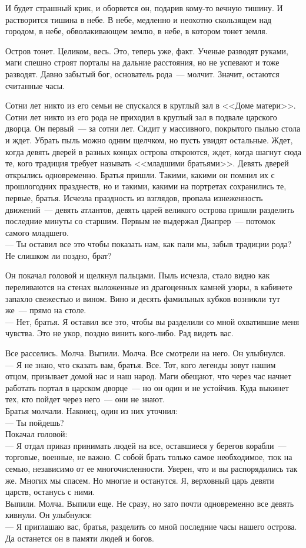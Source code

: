 И будет страшный крик, и оборвется он, подарив кому-то вечную тишину. И 
растворится тишина в небе. В небе, медленно и неохотно скользящем над городом, 
в 
небе, обволакивающем землю, в небе, в котором тонет земля.

Остров тонет. Целиком, весь. Это, теперь уже, факт. Ученые разводят руками, 
маги 
спешно строят порталы на дальние расстояния, но не успевают и тоже разводят. 
Давно забытый бог, основатель рода~--- молчит. Значит, остаются считанные часы.

Сотни лет никто из его семьи не спускался в круглый зал в <<Доме матери>>. 
Сотни 
лет никто из его рода не приходил в круглый зал в подвале царского дворца. Он 
первый~--- за сотни лет. Сидит у массивного, покрытого пылью стола и ждет. 
Убрать 
пыль можно одним щелчком, но пусть увидят остальные. Ждет, когда девять дверей 
в 
разных концах острова откроются, ждет, когда шагнут сюда те, кого традиция 
требует называть <<младшими братьями>>. Девять дверей открылись одновременно. 
Братья пришли. Такими, какими он помнил их с прошлогодних празднеств, но и 
такими, какими на портретах сохранились те, первые, братья. Исчезла праздность 
из взглядов, пропала изнеженность движений~--- девять атлантов, девять царей 
великого острова пришли разделить последние минуты со старшим. Первым не 
выдержал Диапрер~--- потомок самого младшего.\\
--- Ты оставил все это чтобы показать нам, как пали мы, забыв традиции рода? 
Не слишком ли поздно, брат?

Он покачал головой и щелкнул пальцами. Пыль исчезла, стало видно как 
переливаются на стенах выложенные из драгоценных камней узоры, в кабинете 
запахло свежестью и вином. Вино и десять фамильных кубков возникли тут же~--- 
прямо на столе.\\
--- Нет, братья. Я оставил все это, чтобы вы разделили со мной охватившие меня 
чувства. Это не укор, поздно винить кого-либо. Рад видеть вас.

Все расселись. Молча. Выпили. Молча. Все смотрели на него. Он улыбнулся.\\
--- Я не знаю, что сказать вам, братья. Все. Тот, кого легенды зовут нашим 
отцом, призывает домой нас и наш народ. Маги обещают, что через час начнет 
работать портал в царском дворце~--- но он один и не устойчив. Куда выкинет 
тех, кто пойдет через него~--- они не знают.\\
Братья молчали. Наконец, один из них уточнил:\\
--- Ты пойдешь?\\
Покачал головой:\\
--- Я отдал приказ принимать людей на все, оставшиеся у берегов корабли~--- 
торговые, военные, не важно. С собой брать только самое необходимое, тюк на 
семью, независимо от ее многочисленности. Уверен, что и вы распорядились так 
же. 
Многих мы спасем. Но многие и останутся. Я, верховный царь девяти царств, 
останусь с ними.\\
Выпили. Молча. Выпили еще. Не сразу, но зато почти одновременно все девять 
кивнули. Он улыбнулся:\\
--- Я приглашаю вас, братья, разделить со мной последние часы нашего острова. 
Да останется он в памяти людей и богов.\\

